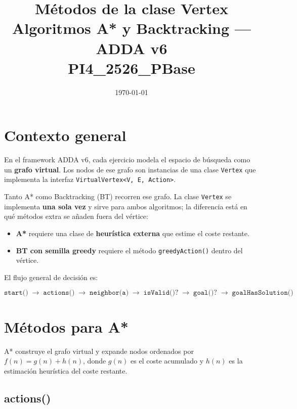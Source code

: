 \documentclass[12pt, a4paper]{article}
\title{
  \textbf{Métodos de la clase Vertex}\\[0.4em]
  \large Algoritmos A* y Backtracking --- ADDA v6\\[0.2em]
  \normalsize PI4\_2526\_PBase
}
\author{}
\date{\today}
\begin{document}
\maketitle
\tableofcontents
\newpage

\section{Contexto general}

En el framework ADDA v6, cada ejercicio modela el espacio de búsqueda como un \textbf{grafo virtual}. Los nodos de ese grafo son instancias de una clase \texttt{Vertex} que implementa la interfaz \texttt{VirtualVertex<V, E, Action>}.

Tanto A* como Backtracking (BT) recorren ese grafo. La clase \texttt{Vertex} se implementa \textbf{una sola vez} y sirve para ambos algoritmos; la diferencia está en qué métodos extra se añaden fuera del vértice:

\begin{itemize}
  \item \textbf{A*} requiere una clase de \textbf{heurística externa} que estime el coste restante.
  \item \textbf{BT con semilla greedy} requiere el método \texttt{greedyAction()} dentro del vértice.
\end{itemize}

El flujo general de decisión es:

\[
\texttt{start()} \;\longrightarrow\; \texttt{actions()} \;\longrightarrow\; \texttt{neighbor(a)} \;\longrightarrow\; \texttt{isValid()?} \;\longrightarrow\; \texttt{goal()?} \;\longrightarrow\; \texttt{goalHasSolution()}
\]

\section{Métodos para A*}

A* construye el grafo virtual y expande nodos ordenados por $f(n) = g(n) + h(n)$, donde $g(n)$ es el coste acumulado y $h(n)$ es la estimación heurística del coste restante.

\subsection{actions()}
\end{document}

